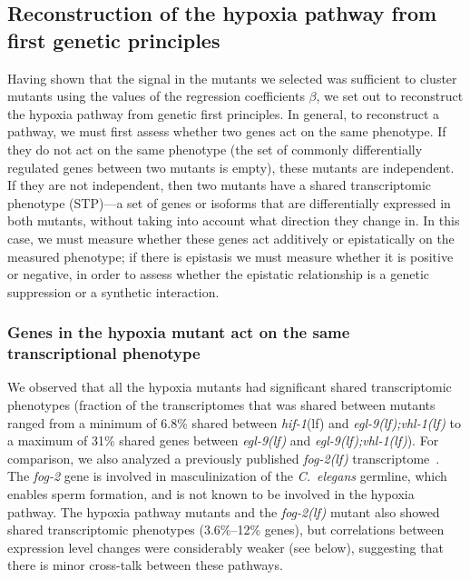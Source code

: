 \documentclass[9pt,twocolumn,twoside]{pnas-new}
\newcommand{\cel}{\emph{C.~elegans}}
\newcommand{\gene}[1]{\emph{#1}}
\newcommand{\fog}{\emph{\mbox{fog-2(lf)}}}
\newcommand{\egl}{\emph{\mbox{egl-9}(lf)}}
\newcommand{\eglvhl}{\emph{\mbox{egl-9(lf);vhl-1(lf)}}}
\newcommand{\hif}{\emph{\mbox{hif-1}}(lf)}
\begin{document}
\subsection*{Reconstruction of the hypoxia pathway from first genetic principles}
\label{sec:reconstruct}
Having shown that the signal in the mutants we selected was sufficient to
cluster mutants using the values of the regression coefficients $\beta$, we set
out to reconstruct the hypoxia pathway from genetic first principles. In general,
to reconstruct a pathway, we must first assess whether two genes act on the same
phenotype. If they do not act on the same phenotype (the set of commonly differentially
regulated genes between two mutants is empty), these mutants are independent.
If they are not independent, then two mutants have a shared transcriptomic
phenotype (STP)---a set of genes or isoforms that are differentially expressed in
both mutants, without taking into account what direction they change in. In this
case, we must measure whether these genes act additively or epistatically on the
measured phenotype; if there is epistasis we must measure whether it is
positive or negative, in order to assess whether the epistatic relationship is a
genetic suppression or a synthetic interaction.

\subsubsection*{Genes in the hypoxia mutant act on the same transcriptional phenotype}
\label{sec:phenotypes}
We observed that all the hypoxia mutants had significant shared transcriptomic
phenotypes (fraction of the transcriptomes that was shared between mutants
ranged from a minimum of 6.8\% shared between \hif{} and \eglvhl{} to a maximum
of 31\% shared genes between \egl{} and \eglvhl{}). For comparison, we also
analyzed a previously published \fog{} transcriptome~\cite{Angeles-Albores2016a}.
The \gene{fog-2} gene is involved in masculinization of the \cel{} germline,
which enables sperm formation, and is not known to be involved in the hypoxia
pathway. The hypoxia pathway mutants and the \fog{} mutant also showed shared
transcriptomic phenotypes (3.6\%--12\% genes), but correlations between
expression level changes were considerably weaker (see below), suggesting that
there is minor cross-talk between these pathways.
\end{document}
